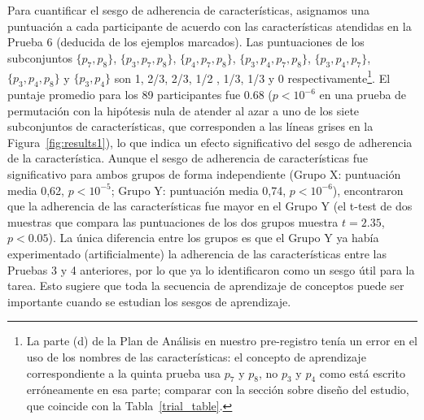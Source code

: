 Para cuantificar el sesgo de adherencia de características, asignamos una puntuación a cada participante de acuerdo con las características atendidas en la Prueba 6 (deducida de los ejemplos marcados). Las puntuaciones de los subconjuntos $ \{p_7, p_8 \} $, $ \{p_3, p_7, p_8 \} $, $ \{p_4, p_7, p_8 \} $, $ \{p_3, p_4, p_7, p_8 \} $, $ \{p_3, p_4, p_7 \} $, $ \{p_3, p_4, p_8 \} $ y $ \{p_3, p_4 \} $ son 1, 2/3, 2/3, 1/2 , 1/3, 1/3 y 0 respectivamente\footnote{La parte (d) de la Plan de Análisis en nuestro pre-registro tenía un error en el uso de los nombres de las características: el concepto de aprendizaje correspondiente a la quinta prueba usa $ p_7 $ y $ p_8 $, no $ p_3 $ y $ p_4 $ como está escrito erróneamente en esa parte; comparar con la sección sobre diseño del estudio, que coincide con la Tabla~\ref{trial_table}.}. El puntaje promedio para los 89 participantes fue 0.68 ($ p <10^{- 6} $ en una prueba de permutación con la hipótesis nula de atender al azar a uno de los siete subconjuntos de características, que corresponden a las líneas grises en la Figura~\ref{fig:results1}), lo que indica un efecto significativo del sesgo de adherencia de la característica. Aunque el sesgo de adherencia de características fue significativo para ambos grupos de forma independiente (Grupo X: puntuación media 0,62, $ p <10^{-5} $; Grupo Y: puntuación media 0,74, $ p <10^{-6} $), encontraron que la adherencia de las características fue mayor en el Grupo Y (el t-test de dos muestras que compara las puntuaciones de los dos grupos muestra $ t = 2.35 $, $ p <0.05 $). La única diferencia entre los grupos es que el Grupo Y ya había experimentado (artificialmente) la adherencia de las características entre las Pruebas 3 y 4 anteriores, por lo que ya lo identificaron como un sesgo útil para la tarea. Esto sugiere que toda la secuencia de aprendizaje de conceptos puede ser importante cuando se estudian los sesgos de aprendizaje.


